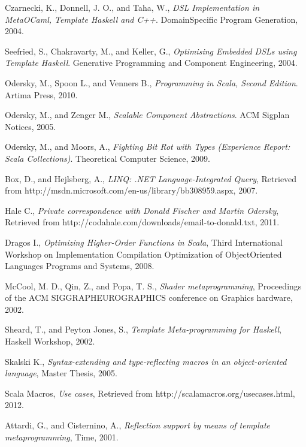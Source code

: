 \documentclass{llncs}
\begin{document}
\begin{thebibliography}{99}

  Czarnecki, K., Donnell, J. O., and Taha, W.,
  \emph{DSL Implementation in MetaOCaml, Template Haskell and C++}.
  DomainSpecific Program Generation,
  2004.

  Seefried, S., Chakravarty, M., and Keller, G.,
  \emph{Optimising Embedded DSLs using Template Haskell}.
  Generative Programming and Component Engineering,
  2004.

  Odersky, M., Spoon L., and Venners B.,
  \emph{Programming in Scala, Second Edition}.
  Artima Press,
  2010.

  Odersky, M., and Zenger M.,
  \emph{Scalable Component Abstractions}.
  ACM Sigplan Notices,
  2005.

  Odersky, M., and Moors, A.,
  \emph{Fighting Bit Rot with Types (Experience Report: Scala Collections)}.
  Theoretical Computer Science,
  2009.

  Box, D., and Hejlsberg, A.,
  \emph{LINQ: .NET Language-Integrated Query},
  Retrieved from http://msdn.microsoft.com/en-us/library/bb308959.aspx,
  2007.

  Hale C.,
  \emph{Private correspondence with Donald Fischer and Martin Odersky},
  Retrieved from http://codahale.com/downloads/email-to-donald.txt,
  2011.

  Dragos I.,
  \emph{Optimizing Higher-Order Functions in Scala},
  Third International Workshop on Implementation Compilation Optimization of ObjectOriented Languages Programs and Systems,
  2008.

  McCool, M. D., Qin, Z., and Popa, T. S.,
  \emph{Shader metaprogramming},
  Proceedings of the ACM SIGGRAPHEUROGRAPHICS conference on Graphics hardware,
  2002.

  Sheard, T., and Peyton Jones, S.,
  \emph{Template Meta-programming for Haskell},
  Haskell Workshop,
  2002.

  Skalski K.,
  \emph{Syntax-extending and type-reflecting macros in an object-oriented language},
  Master Thesis,
  2005.

  Scala Macros,
  \emph{Use cases},
  Retrieved from http://scalamacros.org/usecases.html,
  2012.

  Attardi, G., and Cisternino, A.,
  \emph{Reflection support by means of template metaprogramming},
  Time,
  2001.


\end{thebibliography}
\end{document}
